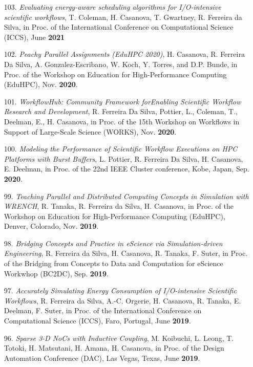 \begin{enumerate}
    \item [103.] {\it Evaluating energy-aware scheduling algorithms for
    I/O-intensive scientific workflows}, T. Coleman, H. Casanova, T.
    Gwartney, R. Ferreira da Silva,
	in Proc. of the International Conference on Computational Science
	(ICCS), June {\bf 2021}


    \item [102.] {\it Peachy Parallel Assignments (EduHPC 2020)},
H. Casanova, R. Ferreira Da Silva, A. Gonzalez-Escribano, W. Koch, Y.
Torres, and D.P. Bunde, in Proc. of the Workshop on Education for
High-Performance Computing (EduHPC), Nov. {\bf 2020}.

\item [101.] {\it WorkflowHub: Community Framework forEnabling
Scientific Workflow Research and Development},
R. Ferreira Da Silva, Pottier, L., Coleman, T., Deelman, E., H. Casanova,
in Proc. of the 15th Workshop on Workflows in Support of
Large-Scale Science (WORKS), Nov. {\bf 2020}.

\item [100.] {\it Modeling the Performance of Scientific Workflow Executions on HPC Platforms with Burst Buffers},
L. Pottier, R. Ferreira Da Silva, H. Casanova, E. Deelman,
in Proc. of the 22nd IEEE Cluster conference, Kobe, Japan, Sep. {\bf 2020}.

\item [99.] {\it Teaching Parallel and Distributed Computing Concepts in
Simulation with WRENCH}, R. Tanaka, R. Ferreira da Silva, H. Casanova, in
Proc. of the Workshop on Education for High-Performance Computing (EduHPC),
Denver, Colorado, Nov. {\bf 2019}.



\item [98.] {\it Bridging Concepts and Practice in eScience via
      Simulation-driven Engineering},
    R. Ferreira da Silva, H. Casanova, R. Tanaka, F. Suter,
	in Proc. of the Bridging from Concepts to Data and Computation for
	eScience Workwhop (BC2DC), Sep. {\bf 2019}.

\item [97.] {\it Accurately Simulating Energy Consumption of I/O-intensive Scientific Workflows}, R. Ferreira da Silva, A.-C. Orgerie, H. Casanova, R. Tanaka, E. Deelman, F. Suter, in Proc. of the International Conference on Computational Science (ICCS), Faro, Portugal, June {\bf 2019}.

\item [96.] {\it Sparse 3-D NoCs with Inductive Coupling}, M. Koibuchi, L. Leong, T. Totoki, H. Matsutani, H. Amana, H. Casanova, in Proc. of the Design Automation Conference (DAC), Las Vegas, Texas, June {\bf 2019}.


\end{enumerate}
